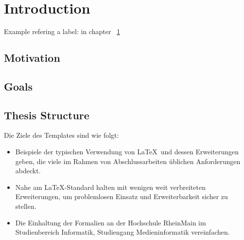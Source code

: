 \documentclass[11pt,a4paper]{report}
\begin{document}

\begin{abstract} 
\LaTeX\ bietet Buchdruckqualität für jedermann.
Wir zeigen anhand dieses durch persönliche Präferenzen geprägtes Template, 
wie man Buchdruckqualität für eine Abschlussarbeit einfach erreichen kann.
Dazu werden beispielhaft Lösungen zu üblichen Fragestellungen im Dokument 
vorgestellt.
Zunächst benötigt man ein passendes \LaTeX\ System mit einigen 
installierten Erweiterungspaketen, das es erlaubt das Template zu 
übersetzen. 
Neben den grundlegenden For\-ma\-tie\-rungs\-möglich\-keiten mit \LaTeX\ wird 
insbesondere das Erstellen und Einbinden von Grafiken, Listings und 
mathematischen Formeln gezeigt.
Des Weiteren werden Literatur- und andere Verzeichnisse eingebunden.
Nicht zuletzt finden sich auch sachdienliche Hinweise zum
Schreiben und Zitieren von Literatur.
\end{abstract}

\tableofcontents
\newpage 

\chapter{Introduction} \label{ch:intro}

Example refering a label:   in chapter ~\ref{ch:intro}

\section{Motivation}
\section{Goals}
\section{Thesis Structure}


Die Ziele des Templates sind wie folgt:
\begin{itemize}
\item Beispiele der typischen Verwendung von \LaTeX\ und dessen Erweiterungen 
  geben, die viele im Rahmen von Abschlussarbeiten üblichen Anforderungen 
  abdeckt.
\item Nahe am \LaTeX-Standard halten mit wenigen weit verbreiteten 
  Erweiterungen, um problemlosen Einsatz und Erweiterbarkeit sicher zu stellen.
\item Die Einhaltung der Formalien an der Hochschule RheinMain im 
  Studienbereich Informatik, Studiengang Medieninformatik vereinfachen.
\end{itemize}
\end{document}
